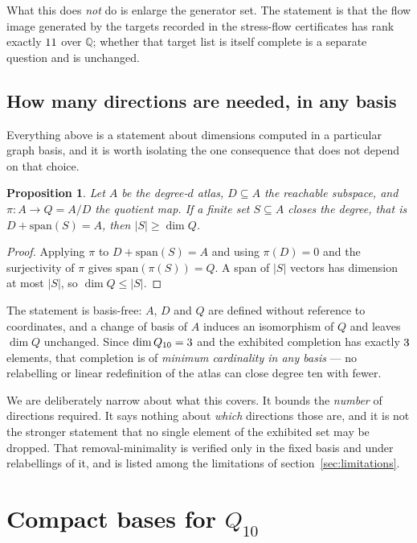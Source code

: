 \documentclass[11pt,a4paper]{article}
\newtheorem{proposition}{Proposition}
\begin{document}
What this does \emph{not} do is enlarge the generator set. The statement is that
the flow image generated by the targets recorded in the stress-flow certificates
has rank exactly $11$ over $\mathbb{Q}$; whether that target list is
itself complete is a separate question and is unchanged.

\subsection{How many directions are needed, in any basis}
\label{sec:cardinality}

Everything above is a statement about dimensions computed in a particular graph
basis, and it is worth isolating the one consequence that does not depend on that
choice.

\begin{proposition}
\label{prop:cardinality}
Let $A$ be the degree-$d$ atlas, $D\subseteq A$ the reachable subspace, and
$\pi : A \to Q = A/D$ the quotient map. If a finite set $S\subseteq A$ closes the
degree, that is $D + \mathrm{span}(S) = A$, then $|S| \ge \dim Q$.
\end{proposition}

\begin{proof}
Applying $\pi$ to $D+\mathrm{span}(S)=A$ and using $\pi(D)=0$ and the
surjectivity of $\pi$ gives $\mathrm{span}(\pi(S)) = Q$. A span of $|S|$ vectors
has dimension at most $|S|$, so $\dim Q \le |S|$.
\end{proof}

The statement is basis-free: $A$, $D$ and $Q$ are defined without reference to
coordinates, and a change of basis of $A$ induces an isomorphism of $Q$ and
leaves $\dim Q$ unchanged. Since $\dim Q_{10} = 3$ and the exhibited
completion has exactly $3$ elements, that completion is of \emph{minimum
cardinality in any basis} --- no relabelling or linear redefinition of the atlas
can close degree ten with fewer.

We are deliberately narrow about what this covers. It bounds the \emph{number} of
directions required. It says nothing about \emph{which} directions those are, and
it is not the stronger statement that no single element of the exhibited set may
be dropped. That removal-minimality is verified only in the fixed basis and under
relabellings of it, and is listed among the limitations of
section~\ref{sec:limitations}.

\section{Compact bases for $Q_{10}$}
\label{sec:pureN}
\end{document}
